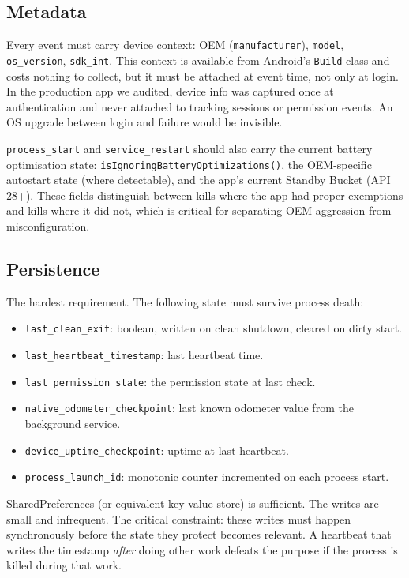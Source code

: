 \documentclass[10pt,journal,compsoc]{IEEEtran}
\begin{document}
\subsection{Metadata}
\label{sec:metadata}

Every event must carry device context: OEM (\texttt{manufacturer}),
\texttt{model}, \texttt{os\_version}, \texttt{sdk\_int}. This context is
available from Android's \texttt{Build} class and costs nothing to
collect, but it must be attached at event time, not only at login. In
the production app we audited, device info was captured once at
authentication and never attached to tracking sessions or permission
events. An OS upgrade between login and failure would be invisible.

\texttt{process\_start} and \texttt{service\_restart} should also carry
the current battery optimisation state:
\texttt{isIgnoringBatteryOptimizations()}, the OEM-specific autostart
state (where detectable), and the app's current Standby Bucket (API
28+). These fields distinguish between kills where the app had proper
exemptions and kills where it did not, which is critical for separating
OEM aggression from misconfiguration.

\subsection{Persistence}
\label{sec:persistence}

The hardest requirement. The following state must survive process death:

\begin{itemize}[nosep]
  \item \texttt{last\_clean\_exit}: boolean, written on clean shutdown,
        cleared on dirty start.
  \item \texttt{last\_heartbeat\_timestamp}: last heartbeat time.
  \item \texttt{last\_permission\_state}: the permission state at last
        check.
  \item \texttt{native\_odometer\_checkpoint}: last known odometer value
        from the background service.
  \item \texttt{device\_uptime\_checkpoint}: uptime at last heartbeat.
  \item \texttt{process\_launch\_id}: monotonic counter incremented on
        each process start.
\end{itemize}

SharedPreferences (or equivalent key-value store) is sufficient. The
writes are small and infrequent. The critical constraint: these writes
must happen synchronously before the state they protect becomes relevant.
A heartbeat that writes the timestamp \emph{after} doing other work
defeats the purpose if the process is killed during that work.
\end{document}
